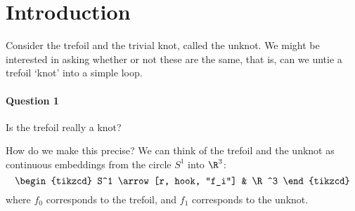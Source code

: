 \documentclass{article}
\numberwithin{nthm}{subsection}
\begin{document}
\maketitle

\tableofcontents

\section{Introduction}
Consider the trefoil and the trivial knot, called the unknot. We might be interested in asking whether or not these are the same, that is, can we untie a trefoil `knot' into a simple loop.

\begin{center}
\end{center}
\paragraph{Question 1} Is the trefoil really a knot?

How do we make this precise?
We can think of the trefoil and the unknot as continuous embeddings from the circle $S^1$ into $\R^3$:
\begin{equation*}
    \begin{tikzcd}
        S^1 \arrow[r, hook, "f_i"] & \R^3
    \end{tikzcd}
\end{equation*}
where $f_0$ corresponds to the trefoil, and $f_1$ corresponds to the unknot.
\end{document}
